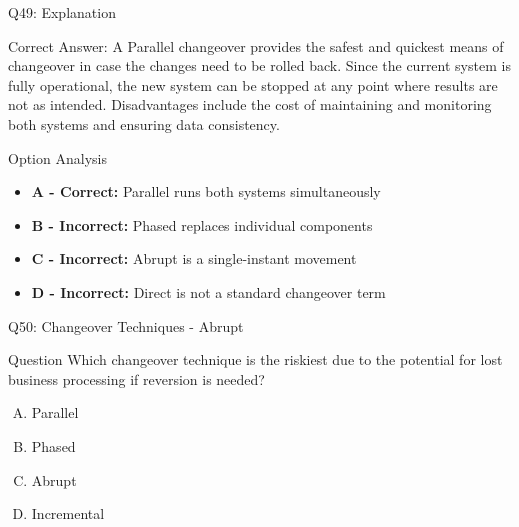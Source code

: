 \documentclass{beamer}
\begin{document}
	\begin{frame}{Q49: Explanation}
		\begin{block}{Correct Answer: A}
			Parallel changeover provides the safest and quickest means of changeover in case the changes need to be rolled back. Since the current system is fully operational, the new system can be stopped at any point where results are not as intended. Disadvantages include the cost of maintaining and monitoring both systems and ensuring data consistency.
		\end{block}
		\begin{block}{Option Analysis}
			\begin{itemize}
				\item \textbf{A - Correct:} Parallel runs both systems simultaneously
				\item \textbf{B - Incorrect:} Phased replaces individual components
				\item \textbf{C - Incorrect:} Abrupt is a single-instant movement
				\item \textbf{D - Incorrect:} Direct is not a standard changeover term
			\end{itemize}
		\end{block}
	\end{frame}
	
	\begin{frame}{Q50: Changeover Techniques - Abrupt}
		\begin{block}{Question}
			Which changeover technique is the riskiest due to the potential for lost business processing if reversion is needed?
		\end{block}
		\begin{enumerate}[(A)]
			\item Parallel
			\item Phased
			\item Abrupt
			\item Incremental
		\end{enumerate}
	\end{frame}
	
\end{document}
